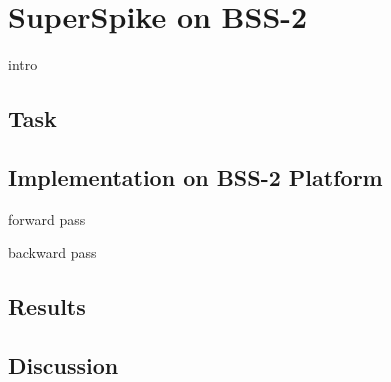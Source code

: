 \section{SuperSpike on BSS-2}
intro

\subsection{Task}

\subsection{Implementation on BSS-2 Platform}
forward pass

backward pass

\subsection{Results}

\subsection{Discussion}
